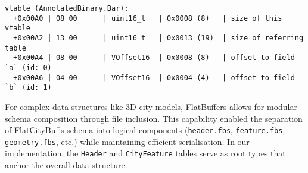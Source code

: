 \begin{lstlisting}[caption=Vtable of AnnotatedBinary.Bar sourced from \citet{flatbuffers_annotation}, label=lst:flatbuffers_vtable]
  vtable (AnnotatedBinary.Bar):
  +0x00A0 | 08 00      | uint16_t   | 0x0008 (8)   | size of this vtable
  +0x00A2 | 13 00      | uint16_t   | 0x0013 (19)  | size of referring table
  +0x00A4 | 08 00      | VOffset16  | 0x0008 (8)   | offset to field `a` (id: 0)
  +0x00A6 | 04 00      | VOffset16  | 0x0004 (4)   | offset to field `b` (id: 1)
\end{lstlisting}

For complex data structures like 3D city models, FlatBuffers allows for modular schema composition through file inclusion. This capability enabled the separation of FlatCityBuf's schema into logical components (\texttt{header.fbs}, \texttt{feature.fbs}, \texttt{geometry.fbs}, etc.) while maintaining efficient serialisation. In our implementation, the \texttt{Header} and \texttt{CityFeature} tables serve as root types that anchor the overall data structure.
